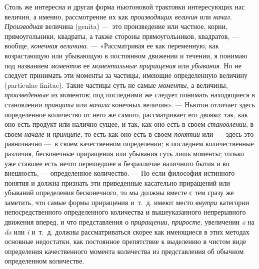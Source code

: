 {Столь же интересна и другая форма ньютоновой трактовки интересующих нас
величин, а именно, рассмотрение их как
{\em производящих величин} или
{\em начал}. {\em Производная}
величина (genita) —~это произведение или частное, корни, прямоугольники,
квадраты, а также стороны прямоугольников, квадратов, — вообще,
{\em конечная величина}. — «Рассматривая ее как
переменную, как возрастающую или убывающую в постоянном движении и течении,
я понимаю под названием {\em моментов} ее
{\em моментальные приращения} или
{\em убывания}. Но не следует принимать эти моменты за
частицы, имеющие определенную величину (particulae finitae). Такие частицы
суть не самые {\em моменты}, а величины,
{\em произведенные} из моментов; под последними же
следует понимать находящиеся в становлении
{\em принципы} или {\em начала}
конечных величин». — Ньютон отличает здесь определенное количество от него
же самого, рассматривает его двояко: так, как оно есть продукт или налично
сущее, и так, как оно есть в своем {\em становлении}, в
своем {\em начале} и
{\em принципе}, то есть как оно есть в своем
{\em понятии} или —~здесь это равнозначно —~в своем
качественном определении; в последнем количественные различия, бесконечные
приращения или убывания суть лишь моменты; только уже ставшее есть нечто
перешедшее в безразличие наличного бытия и во внешность, — определенное
количество. — Но если философия истинного понятия и должна признать эти
приведенные касательно приращений или убываний определения бесконечного, то
мы должны вместе с тем сразу же заметить, что самые формы приращения
и~т.~д. имеют место {\em внутри} категории
непосредственного определенного количества и вышеуказанного непрерывного
движения вперед, и что представления о
{\em приращении}, {\em приросте},
увеличении {\em x} на {\em dx} или
{\em i} и~т.~д. должны рассматриваться скорее как
имеющиеся в этих методах основные недостатки, как постоянное препятствие к
выделению в чистом виде определения качественного момента количества из
представления об обычном определенном количестве.

}
